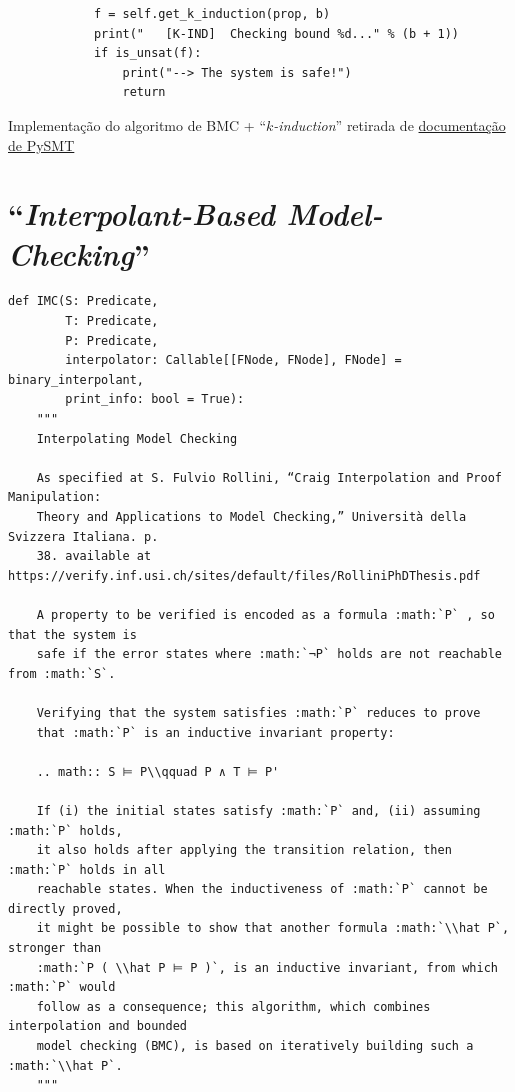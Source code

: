 \documentclass[11pt,a4paper]{report}%
\newenvironment{code}{\captionsetup{type=listing}}{}
\def\imc{``\textit{Interpolant-Based Model-Checking}''\xspace}
\def\kind{``\textit{$k$-induction}''\xspace}
\begin{document}
\begin{code}
\begin{verbatim}
            f = self.get_k_induction(prop, b)
            print("   [K-IND]  Checking bound %d..." % (b + 1))
            if is_unsat(f):
                print("--> The system is safe!")
                return
\end{verbatim}
\caption{Implementação do algoritmo de BMC + \kind retirada de \href{https://pysmt.readthedocs.io/en/latest/tutorials.html##model-checking-an-infinite-state-system-bmc-k-induction-in-150-lines}{documentação de PySMT}}
\label{code:bmc_kind}
\end{code}

\section{\imc}

\begin{code}
\begin{verbatim}
def IMC(S: Predicate,
        T: Predicate,
        P: Predicate,
        interpolator: Callable[[FNode, FNode], FNode] = binary_interpolant,
        print_info: bool = True):
    """
    Interpolating Model Checking

    As specified at S. Fulvio Rollini, “Craig Interpolation and Proof Manipulation:
    Theory and Applications to Model Checking,” Università della Svizzera Italiana. p.
    38. available at https://verify.inf.usi.ch/sites/default/files/RolliniPhDThesis.pdf

    A property to be verified is encoded as a formula :math:`P` , so that the system is
    safe if the error states where :math:`¬P` holds are not reachable from :math:`S`.

    Verifying that the system satisfies :math:`P` reduces to prove
    that :math:`P` is an inductive invariant property:

    .. math:: S ⊨ P\\qquad P ∧ T ⊨ P'

    If (i) the initial states satisfy :math:`P` and, (ii) assuming :math:`P` holds,
    it also holds after applying the transition relation, then :math:`P` holds in all
    reachable states. When the inductiveness of :math:`P` cannot be directly proved,
    it might be possible to show that another formula :math:`\\hat P`, stronger than
    :math:`P ( \\hat P ⊨ P )`, is an inductive invariant, from which :math:`P` would
    follow as a consequence; this algorithm, which combines interpolation and bounded
    model checking (BMC), is based on iteratively building such a :math:`\\hat P`.
    """


\end{verbatim}
\end{code}
\end{document}
